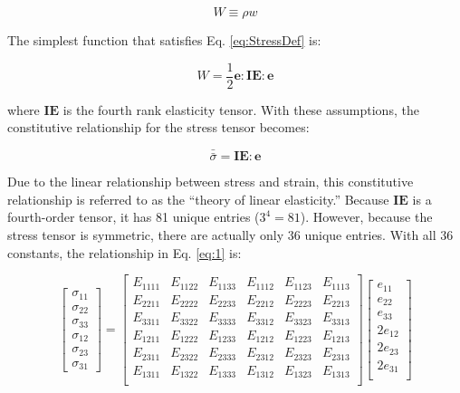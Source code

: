 \documentclass[10pt]{article}
\begin{document}
\begin{equation}
W\equiv \rho w
\end{equation}

The simplest function that satisfies Eq. \eqref{eq:StressDef} is:

\begin{equation}
W=\frac{1}{2}\textbf{e}:\textbf{IE}:\textbf{e}
\end{equation}

where \(\textbf{IE}\) is the fourth rank elasticity tensor. With these assumptions, the constitutive relationship for the stress tensor becomes:

\begin{equation}
\label{eq:1}
\bar{\bar{\sigma}}=\textbf{IE}:\textbf{e}
\end{equation}

Due to the linear relationship between stress and strain, this constitutive relationship is referred to as the ``theory of linear elasticity.'' Because \(\textbf{IE}\) is a fourth-order tensor, it has 81 unique entries (\(3^4=81\)). However, because the stress tensor is symmetric, there are actually only 36 unique entries. With all 36 constants, the relationship in Eq. \eqref{eq:1} is:

\begin{equation}
\begin{bmatrix}\sigma_{11} \\ \sigma_{22} \\ \sigma_{33} \\ \sigma_{12} \\ \sigma_{23} \\ \sigma_{31}\end{bmatrix}=
\begin{bmatrix}E_{1111} & E_{1122} & E_{1133} & E_{1112} & E_{1123} & E_{1113} \\
E_{2211} & E_{2222} & E_{2233} & E_{2212} & E_{2223} & E_{2213} \\
E_{3311} & E_{3322} & E_{3333} & E_{3312} & E_{3323} & E_{3313}\\
E_{1211} & E_{1222} & E_{1233} & E_{1212} & E_{1223} & E_{1213}\\
E_{2311} & E_{2322} & E_{2333} & E_{2312} & E_{2323} & E_{2313}\\
E_{1311} & E_{1322} & E_{1333} & E_{1312} & E_{1323} & E_{1313}\\
\end{bmatrix}
\begin{bmatrix}e_{11} \\ e_{22} \\ e_{33} \\ 2e_{12} \\ 2e_{23} \\ 2e_{31}\\
\end{bmatrix}
\end{equation}
\end{document}
